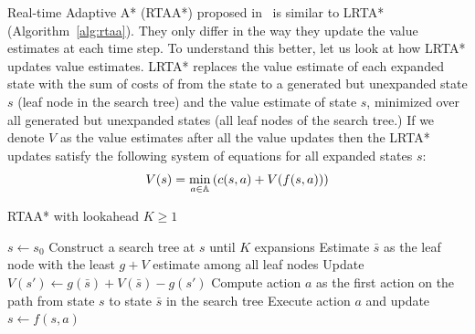 Real-time Adaptive A* (RTAA*) proposed
in~\cite{DBLP:conf/atal/KoenigL06} is similar to LRTA*
(Algorithm~\ref{alg:rtaa}). They only 
differ in the way they update the
value estimates at each time step. To understand this better, let us
look at how LRTA* updates value estimates. LRTA* replaces the value
estimate of each expanded state with the sum of costs of from the
state to a generated but unexpanded state $s$ (leaf node in the search
tree) and the value estimate of state $s$, minimized over all
generated but unexpanded states (all leaf nodes of the search tree.)
If we denote $V$ as the value estimates after all the value
updates then the LRTA* updates satisfy the following system of
equations for all expanded states $s$:
\begin{equation}
  \label{eq:10}
  V(s) = \min_{a \in \mathbb{A}}\left( c(s, a) + V(f(s, a)) \right)
\end{equation}

\begin{algorithm}[t]
  \caption{RTAA* with lookahead $K \geq 1$}
  \begin{algorithmic}[1]
    \State $s \leftarrow s_0$
    \State Construct a search tree at $s$ until $K$ expansions
    \State Estimate $\bar{s}$ as the leaf node with the least $g + V$
    estimate among all leaf nodes
    \State Update $V(s') \leftarrow g(\bar{s}) + V(\bar{s}) - g(s')$
    \EndFor
    \State Compute action $a$ as the first action on the path from
    state $s$ to state $\bar{s}$ in the search tree
    \State Execute action $a$ and update $s \leftarrow f(s, a)$
    \EndWhile
  \end{algorithmic}
  \label{alg:rtaa}
\end{algorithm}

